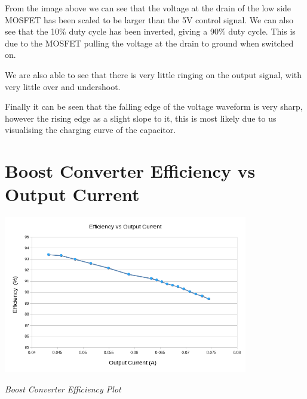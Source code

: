 \documentclass[a4paper,11pt]{article}
\begin{document}
\begin{preview}
From the image above we can see that the voltage at the drain of the low side MOSFET has been scaled to be larger than the 5V control signal. We can also see that the 10\% duty cycle has been inverted, giving a 90\% duty cycle. This is due to the MOSFET pulling the voltage at the drain to ground when switched on. 

We are also able to see that there is very little ringing on the output signal, with very little over and undershoot. 

Finally it can be seen that the falling edge of the voltage waveform is very sharp, however the rising edge as a slight slope to it, this is most likely due to us visualising the charging curve of the capacitor.


\section{Boost Converter Efficiency vs Output Current}

\begin{center}
  \includegraphics[width = 0.8\textwidth]{Efficiency.png}

  \textit{Boost Converter Efficiency Plot}
\end{center}


\end{preview}
\end{document}
